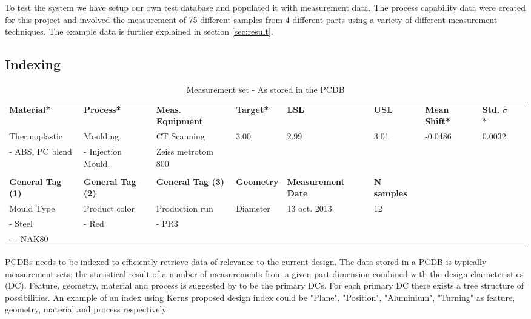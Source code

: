 \documentclass[aip,amsmath, reprint, author-year]{revtex4-1}
\begin{document}
To test the system we have setup our own test database and populated it with measurement data. 
The process capability data were created for this project and involved the measurement of 75 different samples from 4 different parts using a variety of different measurement techniques. 
The example data is further explained in section \ref{sec:result}.


\subsection{Indexing}

\begingroup
\squeezetable

\begin{table}
\begin{ruledtabular}
\caption{\label{tab:sampleset} Measurement set - As stored in the PCDB}
\begin{tabular}{lllllllll}
\textbf{Material*} 		& \textbf{Process*} 		& \textbf{Meas. Equipment}  	& \textbf{Target*} 	& \textbf{LSL} 	& \textbf{USL} 	& \textbf{Mean Shift*} 	& \textbf{Std.}   $\hat{\sigma}$ * & 	\\
Thermoplastic 			& Moulding			& CT Scanning				& 3.00			& 2.99		& 3.01		& -0.0486			& 0.0032				\\
 - ABS, PC blend		& - Injection Mould.		& Zeiss metrotom 800	\\
\\
\textbf{General Tag (1)} 	& \textbf{General Tag (2)} & \textbf{General Tag (3)} 	& \textbf{Geometry}		& \textbf{Measurement Date} 	& \textbf{N samples} 	\\
Mould Type			& Product color			& Production run			& Diameter				& 13 oct. 2013  			& 12\\
- Steel 				& - Red				& - PR3				\\
- - NAK80 
\end{tabular}%
\end{ruledtabular}
\end{table}
\endgroup


PCDBs needs to be indexed to efficiently retrieve data of relevance to the current design. 
The data stored in a PCDB is typically measurement sets; the statistical result of a number of measurements from a given part dimension combined with the design characteristics (DC). 
Feature, geometry, material and process is suggested by \cite{kern2003forecasting} to be the primary DCs. 
For each primary DC there exists a tree structure of possibilities. An example of an index using Kerns proposed design index could be "Plane", "Position", "Aluminium", "Turning" as feature, geometry, material and process respectively. 
\end{document}
